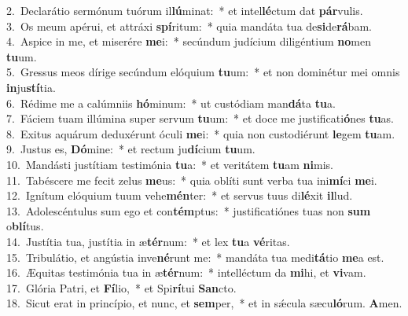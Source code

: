 {2.~}Declarátio sermónum tuórum il\textbf{lú}minat:~* et intel\textbf{lé}ctum dat \textbf{pár}vulis.\\
{3.~}Os meum apérui, et attráxi \textbf{spí}ritum:~* quia mandáta tua de\textbf{si}de\textbf{rá}bam.\\
{4.~}Aspice in me, et miserére \textbf{me}i:~* secúndum judícium diligéntium \textbf{no}men \textbf{tu}um.\\
{5.~}Gressus meos dírige secúndum elóquium \textbf{tu}um:~* et non dominétur mei omnis \textbf{in}ju\textbf{stí}tia.\\
{6.~}Rédime me a calúmniis \textbf{hó}minum:~* ut custódiam man\textbf{dá}ta \textbf{tu}a.\\
{7.~}Fáciem tuam illúmina super servum \textbf{tu}um:~* et doce me justificati\textbf{ó}nes \textbf{tu}as.\\
{8.~}Exitus aquárum deduxérunt óculi \textbf{me}i:~* quia non custodiérunt \textbf{le}gem \textbf{tu}am.\\
{9.~}Justus es, \textbf{Dó}mine:~* et rectum ju\textbf{dí}cium \textbf{tu}um.\\
{10.~}Mandásti justítiam testimónia \textbf{tu}a:~* et veritátem \textbf{tu}am \textbf{ni}mis.\\
{11.~}Tabéscere me fecit zelus \textbf{me}us:~* quia oblíti sunt verba tua ini\textbf{mí}ci \textbf{me}i.\\
{12.~}Ignítum elóquium tuum vehe\textbf{mén}ter:~* et servus tuus di\textbf{lé}xit \textbf{il}lud.\\
{13.~}Adolescéntulus sum ego et con\textbf{tém}ptus:~* justificatiónes tuas non \textbf{sum} o\textbf{blí}tus.\\
{14.~}Justítia tua, justítia in æ\textbf{tér}num:~* et lex \textbf{tu}a \textbf{vé}ritas.\\
{15.~}Tribulátio, et angústia inve\textbf{né}runt me:~* mandáta tua medi\textbf{tá}tio \textbf{me}a est.\\
{16.~}Æquitas testimónia tua in æ\textbf{tér}num:~* intelléctum da \textbf{mi}hi, et \textbf{vi}vam.\\
{17.~}Glória Patri, et \textbf{Fí}lio,~* et Spi\textbf{rí}tui \textbf{San}cto.\\
{18.~}Sicut erat in princípio, et nunc, et \textbf{sem}per,~* et in sǽcula sæcu\textbf{ló}rum. \textbf{A}men.\\
